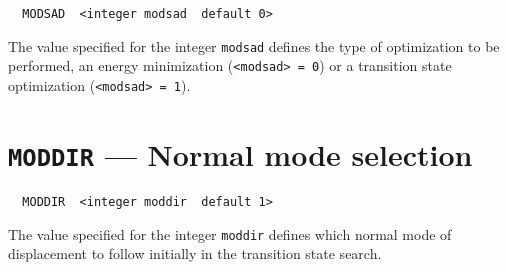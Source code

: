\begin{verbatim}
  MODSAD  <integer modsad  default 0>
\end{verbatim}

The value specified for the integer \verb+modsad+ defines the type   
of optimization to be performed, an energy minimization
(\verb+<modsad> = 0+)
or a transition state optimization (\verb+<modsad> = 1+).

\section{{\tt MODDIR} --- Normal mode selection}

\begin{verbatim}
  MODDIR  <integer moddir  default 1>
\end{verbatim}

The value specified for the integer \verb+moddir+ defines    
which normal mode of displacement to follow initially in the
transition state search.

